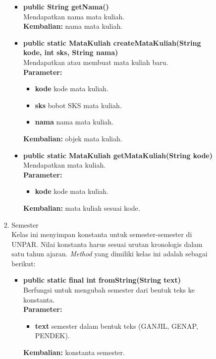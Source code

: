 \documentclass[a4paper,twoside]{article}
\begin{document}
\begin{enumerate}
\begin{enumerate}
\begin{enumerate}
\begin{enumerate}
\begin{itemize}
			\item \textbf{public String getNama()}\\
				Mendapatkan nama mata kuliah.\\
				\textbf{Kembalian:} nama mata kuliah.
				
			\item \textbf{public static MataKuliah createMataKuliah(String kode, int sks, String nama)} \\
			Mendapatkan atau membuat mata kuliah baru.\\
			\textbf{Parameter:}
			\begin{itemize}
				\item \textbf{kode} kode mata kuliah.
				\item \textbf{sks} bobot SKS mata kuliah.
				\item \textbf{nama} nama mata kuliah.
			\end{itemize}
			\textbf{Kembalian:} objek mata kuliah.
			
			\item \textbf{public static MataKuliah getMataKuliah(String kode)}\\
				Mendapatkan mata kuliah.\\
				\textbf{Parameter:}
				\begin{itemize}
					\item \textbf{kode} kode mata kuliah.
				\end{itemize}
				\textbf{Kembalian:} mata kuliah sesuai kode.	
		\end{itemize}
		
		\item Semester\\
		Kelas ini menyimpan konstanta untuk semester-semester di UNPAR. Nilai konstanta harus sesuai urutan kronologis dalam satu tahun ajaran. \textit{Method} yang dimiliki kelas ini adalah sebagai berikut:
		\begin{itemize}
			\item \textbf{public static final int fromString(String text)} \\
			Berfungsi untuk mengubah semester dari bentuk teks ke konstanta. \\
			\textbf{Parameter:}
			\begin{itemize}
				\item \textbf{text} semester dalam bentuk teks (GANJIL, GENAP, PENDEK).
			\end{itemize}
			\textbf{Kembalian:} konstanta semester.
		\end{itemize}
	\end{enumerate}
	

\end{enumerate}
\end{enumerate}
\end{enumerate}
\end{document}
